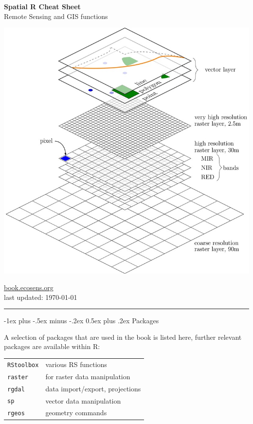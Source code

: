 \documentclass[10pt,landscape]{article}
\makeatletter
\renewcommand{\section}{\@startsection{section}{1}{0mm}%
                                {-1ex plus -.5ex minus -.2ex}%
                                {0.5ex plus .2ex}%
                                {\normalfont\large\bfseries}}
\makeatother
\begin{document}
\newlength{\MyLen}


\raggedright
\footnotesize
\begin{multicols}{3}


\setlength{\premulticols}{1pt}
\setlength{\postmulticols}{1pt}
\setlength{\multicolsep}{1pt}
\setlength{\columnsep}{2pt}

\begin{center}
     \Large{\textbf{Spatial R Cheat Sheet}} \\
     Remote Sensing and GIS functions
\end{center}

\begin{center}
 \includegraphics[width=.25\textwidth]{pics/RS_GIS_Ecology_book_wegmann_leutner_dech_book_ecosens_org_Spatial_Layer_Model.jpg}
\end{center}


\url{book.ecosens.org}\\
last updated: \today

\rule{0.32\textwidth}{0.4pt}


\section{Packages}

A selection of packages that are used in the book is listed here, further relevant packages are available within R:

 \bigskip
 
\begin{tabular}{@{}ll@{}}
\verb!RStoolbox!    & various RS functions  \\
\verb!raster!    & for raster data manipulation \\
\verb!rgdal!  & data import/export, projections \\

\verb!sp!     & vector data manipulation \\
\verb!rgeos!  & geometry commands \\


\end{tabular}
\end{multicols}
\end{document}
